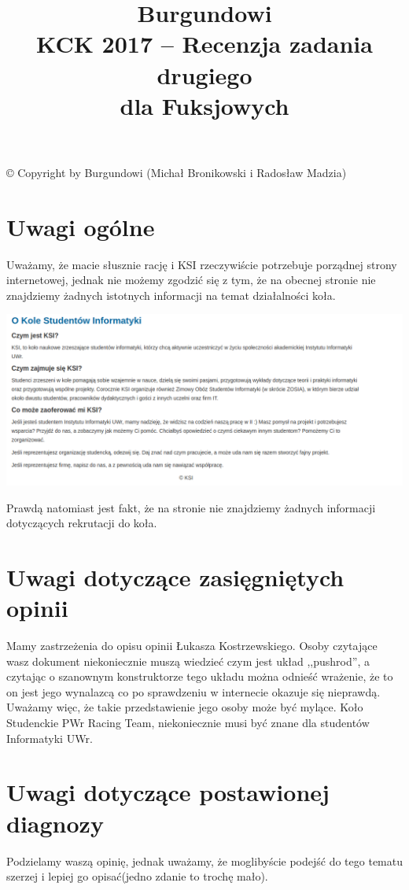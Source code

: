 \documentclass[10pt,a4paper]{article}
\title{Burgundowi\protect \\ \hfill \newline \newline KCK 2017 -- Recenzja zadania drugiego\\ \newline\newline dla \textcolor{Fuksjowy}{Fuksjowych}\\ } %
\begin{document}
\maketitle  %
\thispagestyle{empty}
\vfill
© \scriptsize{Copyright by Burgundowi (Michał Bronikowski i Radosław Madzia)}
\newpage
\tableofcontents
\newpage
\large
\section{Uwagi ogólne}
Uważamy, że macie słusznie rację i KSI rzeczywiście potrzebuje porządnej strony internetowej, jednak nie możemy zgodzić się z tym, że na obecnej stronie nie znajdziemy żadnych istotnych informacji na temat działalności koła.
\begin{center}
\includegraphics[width=\textwidth]{ksi}
\end{center}
Prawdą natomiast jest fakt, że na stronie nie znajdziemy żadnych informacji dotyczących rekrutacji do koła.
\section{Uwagi dotyczące zasięgniętych opinii}
Mamy zastrzeżenia do opisu opinii Łukasza Kostrzewskiego. Osoby czytające wasz dokument niekoniecznie muszą wiedzieć czym jest układ ,,pushrod”, a czytając o szanownym konstruktorze tego układu można odnieść wrażenie, że to on jest jego wynalazcą co po sprawdzeniu w internecie okazuje się nieprawdą. Uważamy więc, że takie przedstawienie jego osoby może być mylące. Koło Studenckie PWr Racing Team, niekoniecznie musi być znane dla studentów Informatyki UWr.
\section{Uwagi dotyczące postawionej diagnozy}
Podzielamy waszą opinię, jednak uważamy, że moglibyście podejść do tego tematu szerzej i lepiej go opisać(jedno zdanie to trochę mało).
\end{document}
